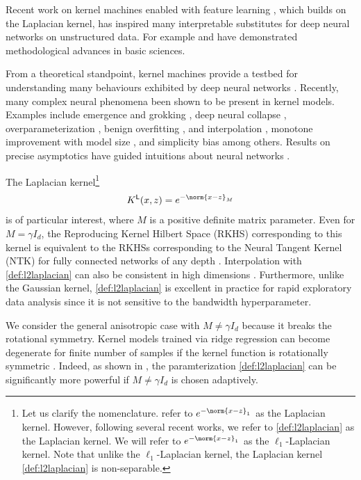 \documentclass{article}
\def\cite{\citep}
\theoremstyle{plain}
\begin{document}
Recent work on kernel machines enabled with feature learning \cite{radhakrishnan2024mechanism}, which builds on the Laplacian kernel, has inspired many interpretable substitutes for deep neural networks on unstructured data. For example \cite{radhakrishnan2024synthetic} and \cite{aristoff2024fast} have demonstrated methodological advances in basic sciences.

From a theoretical standpoint, kernel machines provide a testbed for understanding many behaviours exhibited by deep neural networks \cite{belkin2018understand}. Recently, many complex neural phenomena been shown to be present in kernel models. Examples include emergence and grokking \cite{mallinar2024emergence}, deep neural collapse \cite{beaglehole2024average}, overparameterization \cite{simon2024more,ghosh2023universal}, benign overfitting \cite{mallinar2022benign}, and interpolation \cite{beaglehole2023inconsistency}, monotone improvement with model size \cite{abedsoltan2023toward}, and simplicity bias \cite{radhakrishnan2024mechanism} among others. Results on precise asymptotics \cite{mei2022generalization} have guided intuitions about neural networks \cite{ghorbani2021linearized,bartlett2021deep}.


The Laplacian kernel\footnote[2]{Let us clarify the nomenclature. \cite{rahimi2007random} refer to $e^{-\norm{x-z}_1}$ as the Laplacian kernel. However, following several recent works, we refer to \cref{def:l2laplacian} as the Laplacian kernel. We will refer to $e^{-\norm{x-z}_1}$ as the $\ell_1$-Laplacian kernel.
Note that unlike the $\ell_1$-Laplacian kernel, the Laplacian kernel \eqref{def:l2laplacian} is non-separable.}
\begin{align}
    K^{\textsf{L}}(x,z)=e^{-\norm{x-z}_M}\label{def:l2laplacian}
\end{align} is of particular interest, where $M$ is a positive definite matrix parameter. Even for $M=\gamma I_d$, the Reproducing Kernel Hilbert Space (RKHS) corresponding to this kernel is equivalent to the RKHSs corresponding to the Neural Tangent Kernel (NTK) for fully connected networks of any depth \cite{geifman2020similarity,chen2020deep}. Interpolation with \eqref{def:l2laplacian} can also be consistent in high dimensions \cite{rakhlin2019consistency,mallinar2022benign}.
Furthermore, unlike the Gaussian kernel, \eqref{def:l2laplacian} is excellent in practice for rapid exploratory data analysis since it is not sensitive to the bandwidth hyperparameter.

We consider the general anisotropic case with $M\neq \gamma I_d$ because it breaks the rotational symmetry. Kernel models trained via ridge regression can become degenerate for finite number of samples if the kernel function is rotationally symmetric \cite{karoui2013asymptotic}. Indeed, as shown in \cite{radhakrishnan2024mechanism}, the paramterization \eqref{def:l2laplacian} can be significantly more powerful if $M\neq \gamma I_d$ is chosen adaptively.
\end{document}
